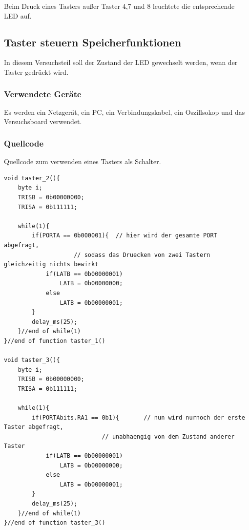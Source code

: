 \documentclass[12pt,a4paper]{article}
\begin{document}
Beim Druck eines Tasters außer  Taster 4,7 und 8 leuchtete die entsprechende LED auf.

\subsection{Taster steuern Speicherfunktionen}

In diesem Versuchsteil soll der Zustand der LED gewechselt werden, wenn der Taster gedrückt wird.

\subsubsection*{Verwendete Geräte}

Es werden ein Netzgerät, ein PC, ein Verbindungskabel, ein Oszillsokop und das Versuchsboard verwendet.

\subsubsection*{Quellcode}

Quellcode zum verwenden eines Tasters als Schalter.

\lstset{language=C, basicstyle=\tiny}
\begin{lstlisting}[caption = {Taster steuert Speicherfunktion}, label=lst:g_6,captionpos=b]
void taster_2(){
	byte i;
	TRISB = 0b00000000;
	TRISA = 0b111111;
	
	while(1){
		if(PORTA == 0b000001){	// hier wird der gesamte PORT abgefragt,
					// sodass das Druecken von zwei Tastern gleichzeitig nichts bewirkt
			if(LATB == 0b00000001)
				LATB = 0b00000000;
			else
				LATB = 0b00000001;
		}
		delay_ms(25);
	}//end of while(1)
}//end of function taster_1()

void taster_3(){
	byte i;
	TRISB = 0b00000000;
	TRISA = 0b111111;
	
	while(1){
		if(PORTAbits.RA1 == 0b1){		// nun wird nurnoch der erste Taster abgefragt,
							// unabhaengig von dem Zustand anderer Taster
			if(LATB == 0b00000001)
				LATB = 0b00000000;
			else
				LATB = 0b00000001;
		}
		delay_ms(25);
	}//end of while(1)
}//end of function taster_3()
\end{lstlisting}
\end{document}
